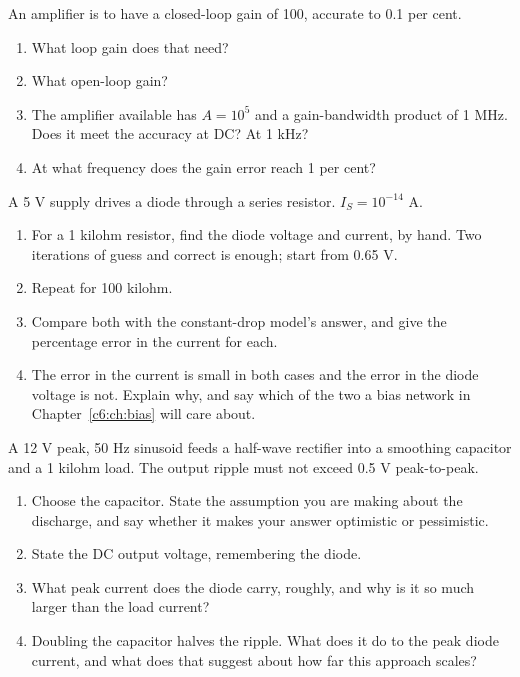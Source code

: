 \label{c4:ex:3}
An amplifier is to have a closed-loop gain of 100, accurate to 0.1 per cent.

\begin{enumerate}
  \item What loop gain does that need?
  \item What open-loop gain?
  \item The amplifier available has $A = 10^5$ and a gain-bandwidth product of 1 MHz. Does it meet the accuracy at DC? At 1 kHz?
  \item At what frequency does the gain error reach 1 per cent?
\end{enumerate}

\label{c4:ex:4}
A 5 V supply drives a diode through a series resistor. $I_S = 10^{-14}$ A.

\begin{enumerate}
  \item For a 1 kilohm resistor, find the diode voltage and current, by hand. Two iterations of guess and correct is enough; start from 0.65 V.
  \item Repeat for 100 kilohm.
  \item Compare both with the constant-drop model's answer, and give the percentage error in the current for each.
  \item The error in the current is small in both cases and the error in the diode voltage is not. Explain why, and say which of the two a bias network in Chapter~\ref{c6:ch:bias} will care about.
\end{enumerate}

\label{c4:ex:5}
A 12 V peak, 50 Hz sinusoid feeds a half-wave rectifier into a smoothing capacitor and a 1 kilohm load. The output ripple must not exceed 0.5 V peak-to-peak.

\begin{enumerate}
  \item Choose the capacitor. State the assumption you are making about the discharge, and say whether it makes your answer optimistic or pessimistic.
  \item State the DC output voltage, remembering the diode.
  \item What peak current does the diode carry, roughly, and why is it so much larger than the load current?
  \item Doubling the capacitor halves the ripple. What does it do to the peak diode current, and what does that suggest about how far this approach scales?
\end{enumerate}

